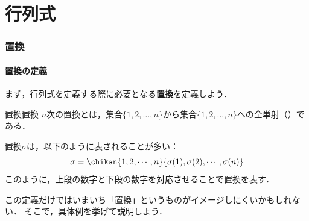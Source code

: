\part{行列式}

\begin{abstract}
  この章では「行列式」に関連する基本的な用語や概念を定義し，それらの関係性を明確にする．
\end{abstract}

\section{置換}

\subsection{置換の定義}

まず，行列式を定義する際に必要となる\textbf{置換}を定義しよう．

\begin{definition}{置換}{置換}
  $n$次の置換とは，集合$\{1, 2, \dots, n\}$から集合$\{1, 2, \dots, n\}$への全単射（）である．
  
  置換$\sigma$は，以下のように表されることが多い：
  \[
  \sigma = \chikan{1, 2, \cdots, n}{\sigma(1), \sigma(2), \cdots, \sigma(n)}
  \]
  このように，上段の数字と下段の数字を対応させることで置換を表す．
\end{definition}

この定義だけではいまいち「置換」というものがイメージしにくいかもしれない．
そこで，具体例を挙げて説明しよう．

